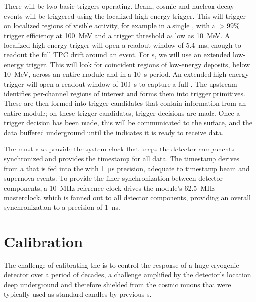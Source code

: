 There will be two basic triggers operating. Beam, cosmic and nucleon decay events will be triggered using the localized high-energy trigger. This will trigger on localized regions of visible activity, for example in a single , with a $>99\%$ trigger efficiency at \SI{100}{\mega\electronvolt} and a trigger threshold as low as \SI{10}{\mega\electronvolt}. A localized high-energy trigger will open a readout window of \SI{5.4}{\ms}, enough to readout the full TPC drift around an event. For s, we will use an extended low-energy trigger. This will look for coincident regions of low-energy deposits, below \SI{10}{\mega\electronvolt}, across an entire module and in a \SI{10}{\second} period. An extended high-energy trigger will open a readout window of \SI{100}{\second} to capture a full . The upstream  identifies per-channel regions of interest and forms them into trigger primitives. These are then formed into trigger candidates that contain information from an entire module; on these trigger candidates, trigger decisions are made. Once a trigger decision has been made, this will be communicated to the surface, and the data buffered underground until the  indicates it is ready to receive data.

The  must also provide the system clock that keeps the detector components synchronized and provides the timestamp for all data. The timestamp derives from a   that is fed into the  with \SI{1}{\micro\second} precision, adequate to timestamp beam and supernova events. To provide the finer synchronization between detector components, a \SI{10}{\mega\hertz} reference clock drives the module's \SI{62.5}{\mega\hertz} masterclock, which is fanned out to all detector components, providing an overall synchronization to a precision of \SI{1}{\nano\second}.

\section{Calibration}
\label{sec:fdsp-exec-calibration}

The challenge of calibrating the   is to control the response of a huge cryogenic detector over a period of decades, a challenge amplified by the detector's location deep underground and therefore shielded from the cosmic muons that were typically used as standard candles by previous s.

